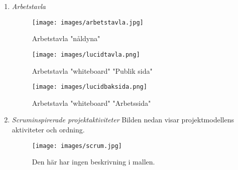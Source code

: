 \begin{enumerate}
    \item \textit{Arbetstavla}
    \begin{figure}[htbp]
        \centerline{\texttt{[image: images/arbetstavla.jpg]}}
        \caption{Arbetstavla "nåldyna"}
        \label{fig}
    \end{figure}
    
    \begin{figure}[htbp]
        \centerline{\texttt{[image: images/lucidtavla.png]}}
        \caption{Arbetstavla "whiteboard" "Publik sida"}
        \label{fig}
    \end{figure}

    \begin{figure}[htbp]
        \centerline{\texttt{[image: images/lucidbaksida.png]}}
        \caption{Arbetstavla "whiteboard" "Arbetssida"}
        \label{fig}
    \end{figure}
    \item \textit{Scruminspirerade projektaktiviteter}
    Bilden nedan visar projektmodellens aktiviteter och ordning.

    \begin{figure}[htbp]
        \centerline{\texttt{[image: images/scrum.jpg]}}
        \caption{Den här har ingen beskrivning i mallen.}
        \label{fig}
    \end{figure}
\end{enumerate}
